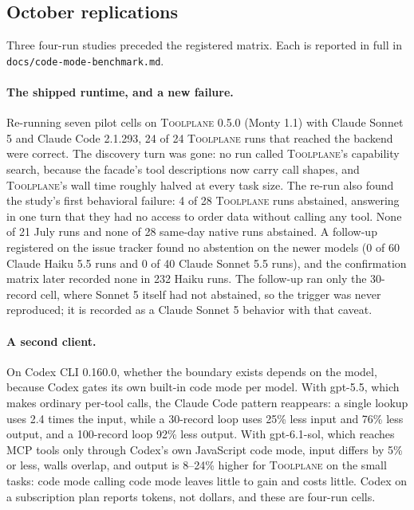 \documentclass[10pt,twocolumn]{article}
\newcommand{\toolplane}{\textsc{Toolplane}\xspace}
\begin{document}
\subsection{October replications}
\label{sec:october}

Three four-run studies preceded the registered matrix.  Each is reported in
full in \texttt{docs/code-mode-benchmark.md}.

\paragraph{The shipped runtime, and a new failure.}  Re-running seven pilot
cells on \toolplane 0.5.0 (Monty 1.1) with Claude Sonnet 5 and Claude Code
2.1.293, 24 of 24 \toolplane runs that reached the backend were correct.  The
discovery turn was gone: no run called \toolplane's capability search, because
the facade's tool descriptions now carry call shapes, and \toolplane's wall
time roughly halved at every task size.  The re-run also found the study's
first behavioral failure: 4 of 28 \toolplane runs abstained, answering in one
turn that they had no access to order data without calling any tool.  None of
21 July runs and none of 28 same-day native runs abstained.  A follow-up
registered on the issue tracker found no abstention on the newer models (0 of
60 Claude Haiku 5.5 runs and 0 of 40 Claude Sonnet 5.5 runs), and the
confirmation matrix later recorded none in 232 Haiku runs.  The follow-up ran
only the 30-record cell, where Sonnet 5 itself had not abstained, so the
trigger was never reproduced; it is recorded as a Claude Sonnet 5 behavior with
that caveat.

\paragraph{A second client.}  On Codex CLI 0.160.0, whether the boundary
exists depends on the model, because Codex gates its own built-in code mode per
model.  With gpt-5.5, which makes ordinary per-tool calls, the Claude Code
pattern reappears: a single lookup uses 2.4 times the input, while a 30-record
loop uses 25\% less input and 76\% less output, and a 100-record loop 92\% less
output.  With gpt-6.1-sol, which reaches MCP tools only through Codex's own
JavaScript code mode, input differs by 5\% or less, walls overlap, and output
is 8--24\% higher for \toolplane on the small tasks: code mode calling code
mode leaves little to gain and costs little.  Codex on a subscription
plan reports tokens, not dollars, and these are four-run cells.
\end{document}
